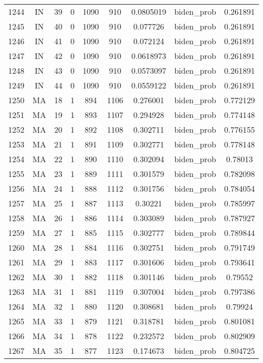 \documentclass[12pt,a4paper]{article}
\begin{document}
\begin{tabular}{r|cccccccc}
	1244 & IN & 39 & 0 & 1090 & 910 & 0.0805019 & biden\_prob & 0.261891 \\
	1245 & IN & 40 & 0 & 1090 & 910 & 0.077726 & biden\_prob & 0.261891 \\
	1246 & IN & 41 & 0 & 1090 & 910 & 0.072124 & biden\_prob & 0.261891 \\
	1247 & IN & 42 & 0 & 1090 & 910 & 0.0618973 & biden\_prob & 0.261891 \\
	1248 & IN & 43 & 0 & 1090 & 910 & 0.0573097 & biden\_prob & 0.261891 \\
	1249 & IN & 44 & 0 & 1090 & 910 & 0.0559122 & biden\_prob & 0.261891 \\
	1250 & MA & 18 & 1 & 894 & 1106 & 0.276001 & biden\_prob & 0.772129 \\
	1251 & MA & 19 & 1 & 893 & 1107 & 0.294928 & biden\_prob & 0.774148 \\
	1252 & MA & 20 & 1 & 892 & 1108 & 0.302711 & biden\_prob & 0.776155 \\
	1253 & MA & 21 & 1 & 891 & 1109 & 0.302771 & biden\_prob & 0.778148 \\
	1254 & MA & 22 & 1 & 890 & 1110 & 0.302094 & biden\_prob & 0.78013 \\
	1255 & MA & 23 & 1 & 889 & 1111 & 0.301579 & biden\_prob & 0.782098 \\
	1256 & MA & 24 & 1 & 888 & 1112 & 0.301756 & biden\_prob & 0.784054 \\
	1257 & MA & 25 & 1 & 887 & 1113 & 0.30221 & biden\_prob & 0.785997 \\
	1258 & MA & 26 & 1 & 886 & 1114 & 0.303089 & biden\_prob & 0.787927 \\
	1259 & MA & 27 & 1 & 885 & 1115 & 0.302777 & biden\_prob & 0.789844 \\
	1260 & MA & 28 & 1 & 884 & 1116 & 0.302751 & biden\_prob & 0.791749 \\
	1261 & MA & 29 & 1 & 883 & 1117 & 0.301606 & biden\_prob & 0.793641 \\
	1262 & MA & 30 & 1 & 882 & 1118 & 0.301146 & biden\_prob & 0.79552 \\
	1263 & MA & 31 & 1 & 881 & 1119 & 0.307004 & biden\_prob & 0.797386 \\
	1264 & MA & 32 & 1 & 880 & 1120 & 0.308681 & biden\_prob & 0.79924 \\
	1265 & MA & 33 & 1 & 879 & 1121 & 0.318781 & biden\_prob & 0.801081 \\
	1266 & MA & 34 & 1 & 878 & 1122 & 0.232572 & biden\_prob & 0.802909 \\
	1267 & MA & 35 & 1 & 877 & 1123 & 0.174673 & biden\_prob & 0.804725 \\

\end{tabular}
\end{document}

